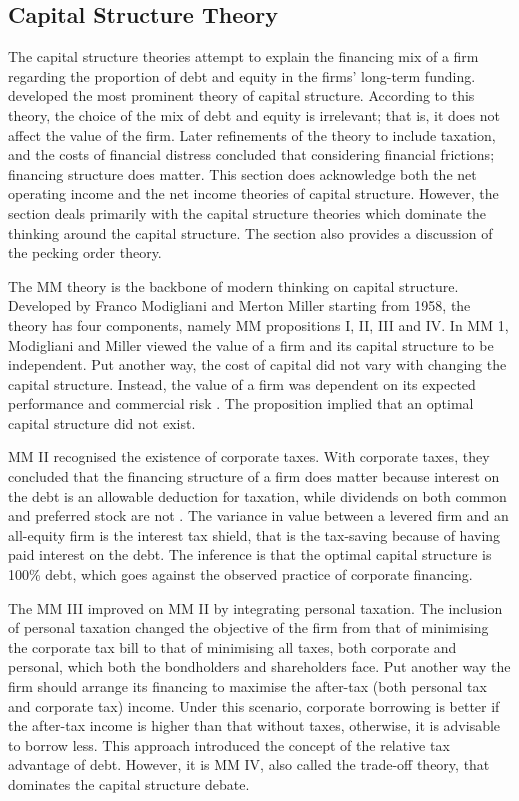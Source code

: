 \documentclass[a4paper,nobind]{templates/ociamthesis}
\begin{document}
\hypertarget{capital-structure-theory}{%
\subsection{Capital Structure Theory}\label{capital-structure-theory}}

\noindent The capital structure theories attempt to explain the financing mix of a firm regarding the proportion of debt and equity in the firms' long-term funding. \textcite{modigliani1958cost} developed the most prominent theory of capital structure. According to this theory, the choice of the mix of debt and equity is irrelevant; that is, it does not affect the value of the firm. Later refinements of the theory to include taxation, and the costs of financial distress concluded that considering financial frictions; financing structure does matter. This section does acknowledge both the net operating income and the net income theories of capital structure. However, the section deals primarily with the \textcite{modigliani1958cost} capital structure theories which dominate the thinking around the capital structure. The section also provides a discussion of the pecking order theory.

The MM theory is the backbone of modern thinking on capital structure. Developed by Franco Modigliani and Merton Miller starting from 1958, the theory has four components, namely MM propositions I, II, III and IV. In MM 1, Modigliani and Miller viewed the value of a firm and its capital structure to be independent. Put another way, the cost of capital did not vary with changing the capital structure. Instead, the value of a firm was dependent on its expected performance and commercial risk \autocite{myers2001capital,chang2015reconsideration}. The proposition implied that an optimal capital structure did not exist.

MM II recognised the existence of corporate taxes. With corporate taxes, they concluded that the financing structure of a firm does matter because interest on the debt is an allowable deduction for taxation, while dividends on both common and preferred stock are not \autocite{dempsey2014m}. The variance in value between a levered firm and an all-equity firm is the interest tax shield, that is the tax-saving because of having paid interest on the debt. The inference is that the optimal capital structure is 100\% debt, which goes against the observed practice of corporate financing.

The MM III improved on MM II by integrating personal taxation. The inclusion of personal taxation changed the objective of the firm from that of minimising the corporate tax bill to that of minimising all taxes, both corporate and personal, which both the bondholders and shareholders face. Put another way the firm should arrange its financing to maximise the after-tax (both personal tax and corporate tax) income. Under this scenario, corporate borrowing is better if the after-tax income is higher than that without taxes, otherwise, it is advisable to borrow less. This approach introduced the concept of the relative tax advantage of debt. However, it is MM IV, also called the trade-off theory, that dominates the capital structure debate.
\end{document}
